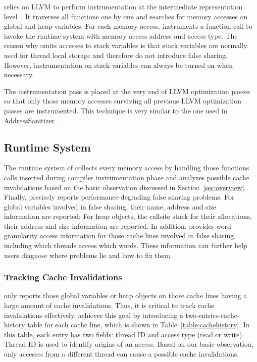 \Predator{} relies on LLVM to perform instrumentation at the intermediate representation level~\cite{llvm}.
It traverses all functions one by one and 
searches for memory accesses on global and heap variables. 
For each memory access, \Predator{} instruments a function call to 
invoke the runtime system with memory access address and access type.
The reason why \Predator{} omits accesses to stack variables 
is that stack variables are normally used for thread local storage and
therefore do not introduce false sharing. However, instrumentation on stack
variables can always be turned on when necessary. 

The instrumentation pass is placed at the very end of LLVM optimization passes 
so that only those memory accesses surviving all previous 
LLVM optimization passes are instrumented. 
This  technique is very similar to the one used in AddressSanitizer~\cite{Addresssanitizer}.

\subsection{Runtime System}
\label{sec:runtime}
The runtime system of \Predator{} collects every memory access by handling 
those functions calls inserted during compiler instrumentation phase and analyzes
possible cache invalidations based on the basic observation discussed in Section~\ref{sec:overview}.
Finally, \Predator{} precisely reports performance-degrading false sharing problems.
For global variables involved in false sharing, their name, address and size
information are reported; For heap objects, the callsite stack for their allocations, 
their address and size information are reported.
In addition, \Predator{} provides word granularity access information for those cache lines 
involved in false sharing, including which threads access which words. 
These information can further help 
users diagnose where problems lie and how to fix them.

\subsubsection{Tracking Cache Invalidations}
\Predator{} only reports those global variables or heap objects on 
those cache lines having a large amount of cache invalidations. 
Thus, it is critical to track cache invalidations effectively. 
\Predator{} achieves this goal by introducing a  
two-entries-cache-history table for each cache line, which is 
shown in Table~\ref{table:cachehistory}. 
In this table, each entry has two fields: thread ID and access type (read or write).
Thread ID is used to identify origins of an access. Based on our basic observation,
only accesses from a different thread can cause a possible cache invalidations. 


